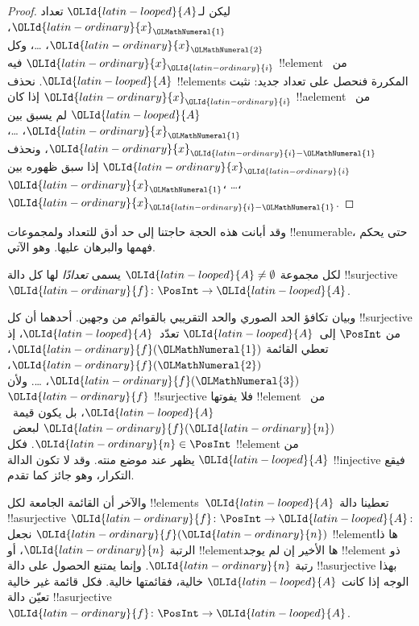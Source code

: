 \documentclass[../../../include/open-logic-section]{subfiles}
\begin{document}
\begin{proof}
ليكن لـ$\OLId{latin-looped}{A}$ تعداد $\OLId{latin-ordinary}{x}_\OLMathNumeral{1}$، $\OLId{latin-ordinary}{x}_\OLMathNumeral{2}$، \dots{}، وكل $\OLId{latin-ordinary}{x}_\OLId{latin-ordinary}{i}$ فيه !!{element}
من~$\OLId{latin-looped}{A}$. نحذف !!{element}s المكررة فنحصل على تعداد جديد:
نثبت $\OLId{latin-ordinary}{x}_\OLId{latin-ordinary}{i}$ إذا كان !!a{element} من~$\OLId{latin-looped}{A}$ لم يسبق بين
$\OLId{latin-ordinary}{x}_\OLMathNumeral{1}$، \dots، $\OLId{latin-ordinary}{x}_{\OLId{latin-ordinary}{i}-\OLMathNumeral{1}}$، ونحذف $\OLId{latin-ordinary}{x}_\OLId{latin-ordinary}{i}$ إذا سبق ظهوره بين
$\OLId{latin-ordinary}{x}_\OLMathNumeral{1}$، \dots،~$\OLId{latin-ordinary}{x}_{\OLId{latin-ordinary}{i}-\OLMathNumeral{1}}$.
\end{proof}

وقد أبانت هذه الحجة حاجتنا إلى حد أدق للتعداد ولمجموعات
!!{enumerable}، حتى يحكم فهمها والبرهان عليها. وهو الآتي.

\begin{defn}
لكل مجموعة $\OLId{latin-looped}{A} \neq \emptyset$ يسمى \emph{تعدادًا} لها كل دالة
!!{surjective} $\OLId{latin-ordinary}{f} \colon \PosInt \to \OLId{latin-looped}{A}$.
\end{defn}

\begin{explain}
وبيان تكافؤ الحد الصوري والحد التقريبي بالقوائم من وجهين.
أحدهما أن كل !!{surjective} من $\PosInt$ إلى~$\OLId{latin-looped}{A}$ تعدّد~$\OLId{latin-looped}{A}$،
إذ تعطي القائمة $\OLId{latin-ordinary}{f}(\OLMathNumeral{1})$، $\OLId{latin-ordinary}{f}(\OLMathNumeral{2})$، $\OLId{latin-ordinary}{f}(\OLMathNumeral{3})$، \dots.
ولأن $\OLId{latin-ordinary}{f}$ !!{surjective} فلا يفوتها !!{element} من~$\OLId{latin-looped}{A}$، بل يكون
قيمة~$\OLId{latin-ordinary}{f}(\OLId{latin-ordinary}{n})$ لبعض~$\OLId{latin-ordinary}{n} \in \PosInt$. فكل !!{element} من $\OLId{latin-looped}{A}$ يظهر
عند موضع منته. وقد لا تكون الدالة !!{injective} فيقع التكرار،
وهو جائز كما تقدم.

والآخر أن القائمة الجامعة لكل !!{element}s~$\OLId{latin-looped}{A}$ تعطينا دالة
!!a{surjective} $\OLId{latin-ordinary}{f}\colon \PosInt \to \OLId{latin-looped}{A}$: نجعل $\OLId{latin-ordinary}{f}(\OLId{latin-ordinary}{n})$
!!{element}ها ذا الرتبة $\OLId{latin-ordinary}{n}$، أو !!{element}ها الأخير إن لم يوجد
!!{element} ذو رتبة $\OLId{latin-ordinary}{n}$. وإنما يمتنع الحصول على دالة
!!a{surjective} بهذا الوجه إذا كانت $\OLId{latin-looped}{A}$ خالية، فقائمتها خالية.
فكل قائمة غير خالية تعيّن دالة !!a{surjective} $\OLId{latin-ordinary}{f}\colon \PosInt \to \OLId{latin-looped}{A}$.
\end{explain}
\end{document}
